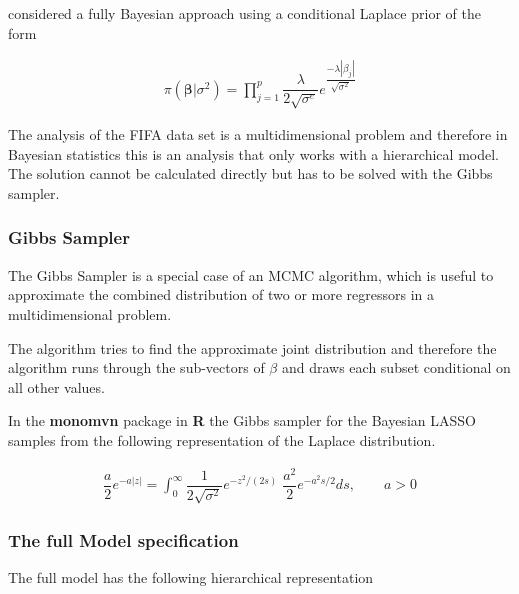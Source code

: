 \documentclass[12pt,a4paper]{article}
\begin{document}
\textcite{park_bayesian_2008} considered a fully Bayesian approach using
a conditional Laplace prior of the form

\begin{align} 
\label{eq:la_bay_prior}
 \pi \left( \pmb{\beta} | \sigma^2 \right)   = \prod_{j = 1}^{p} \dfrac{\lambda}{2 \sqrt{\sigma^e}} e^{\dfrac{- \lambda |\beta_j |}{\sqrt{\sigma^2}}} 
\end{align}

The analysis of the FIFA data set is a multidimensional problem and
therefore in Bayesian statistics this is an analysis that only works
with a hierarchical model. The solution cannot be calculated directly
but has to be solved with the Gibbs sampler.

\hypertarget{gibbs-sampler}{%
\subsubsection{Gibbs Sampler}\label{gibbs-sampler}}

The Gibbs Sampler is a special case of an \ac{MCMC} algorithm, which is
useful to approximate the combined distribution of two or more
regressors in a multidimensional problem.

The algorithm tries to find the approximate joint distribution and
therefore the algorithm runs through the sub-vectors of \(\beta\) and
draws each subset conditional on all other values.
\autocite{gelman_bayesian_2004}

\newpage

In the \textbf{monomvn} package in \textbf{R}
\autocite{gramacy_monomvn_2019} the Gibbs sampler for the Bayesian
\ac{LASSO} samples from the following representation of the Laplace
distribution. \textcite{andrews_scale_1974}

\begin{align} 
\label{eq:gibbs}
  \dfrac{a}{2}e^{-a |z|} = \int_{0}^{\infty} \dfrac{1}{2 \sqrt{\sigma^2}} e^{ -z^2 / (2s)} \; \dfrac{a^2}{2} e^{ -a^2 s /2} ds, \qquad a > 0 
\end{align}

\hypertarget{the-full-model-specification}{%
\subsubsection{The full Model
specification}\label{the-full-model-specification}}

The full model has the following hierarchical representation
\end{document}

